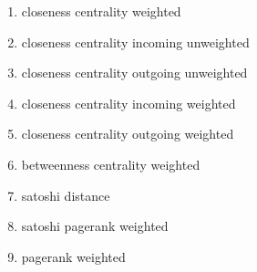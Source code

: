 \begin{enumerate}
  \item{closeness centrality weighted}
  \item{closeness centrality incoming unweighted}
  \item{closeness centrality outgoing unweighted}
  \item{closeness centrality incoming weighted}
  \item{closeness centrality outgoing weighted}
  \item{betweenness centrality weighted}
  \item{satoshi distance}
  \item{satoshi pagerank weighted}
  \item{pagerank weighted}
\end{enumerate}
